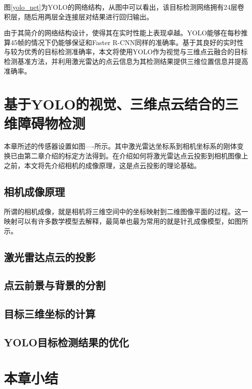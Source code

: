 
图\ref{yolo_net}为YOLO的网络结构，从图中可以看出，该目标检测网络拥有24层卷积层，随后用两层全连接层对结果进行回归输出。

由于其简介的网络结构设计，使得其在实时性能上表现卓越。YOLO能够在每秒推算45帧的情况下仍能够保证和Faster R-CNN同样的准确率。基于其良好的实时性与较为优秀的目标检测准确率，本文将使用YOLO作为视觉与三维点云融合的目标检测基准方法，并利用激光雷达的点云信息为其检测结果提供三维位置信息并提高准确率。

\section{基于YOLO的视觉、三维点云结合的三维障碍物检测}
本章所述的传感器设置如图----所示。其中激光雷达坐标系到相机坐标系的刚体变换已由第二章介绍的标定方法得到。在介绍如何将激光雷达点云投影到相机图像上之前，本文将先介绍相机的成像原理，这是点云投影的理论基础。

\subsection{相机成像原理}

所谓的相机成像，就是相机将三维空间中的坐标映射到二维图像平面的过程。这一映射可以有许多数学模型去解释，最简单也最为常用的就是针孔成像模型，如图所示。

\subsection{激光雷达点云的投影}

\subsection{点云前景与背景的分割}

\subsection{目标三维坐标的计算}

\subsection{YOLO目标检测结果的优化}




\section{本章小结}